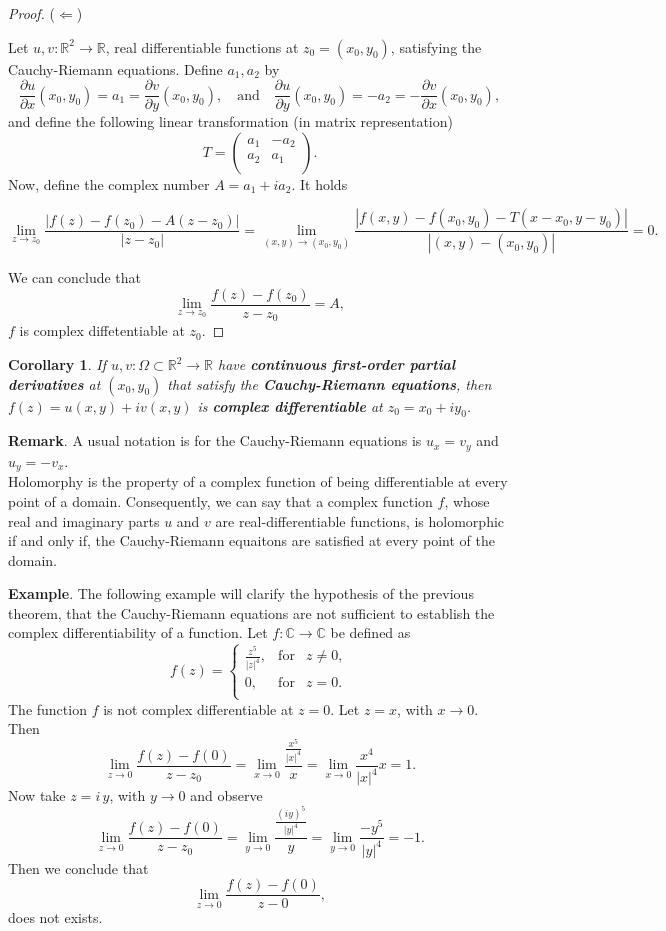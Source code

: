 \documentclass{amsart}
\newtheorem{cor}{Corollary}
\begin{document}
\begin{proof}
(\(\Leftarrow\))

Let \(u,v:\mathbb{R}^2 \to \mathbb{R}\), real differentiable functions at \(z_0 = (x_0, y_0)\), satisfying the Cauchy-Riemann equations. Define \(a_1, a_2\) by
\[  \frac{\partial u}{\partial x}(x_0,y_0) = a_1 = \frac{\partial v}{\partial y}(x_0,y_0), \quad \mbox{and} \quad \frac{\partial u}{\partial y}(x_0,y_0) = - a_2 = - \frac{\partial v}{\partial x}(x_0,y_0),\]
and define the following linear transformation (in matrix representation)
\[ 
T = \left( \begin{array}{cc}
a_1 &  -a_2 \\
a_2 &  a_1 \\
\end{array} \right). \]
Now, define the complex number \(A = a_1 + i a_2\). It holds

\[ \lim_{z\to z_0} \frac{| f(z) - f(z_0) - A (z-z_0) |}{|z- z_0|} = \lim_{(x,y)\to (x_0, y_0)} \frac{| f(x,y) - f(x_0,y_0) - T ( x-x_0, y-y_0) |}{|(x,y) - (x_0, y_0)|} = 0. \]

We can conclude that
\[ \lim_{z\to z_0} \frac{f(z) - f(z_0)}{z- z_0} = A, \]
\(f\) is complex diffetentiable at \(z_0\).
\end{proof}


\begin{cor}
If \(u,v:\Omega\subset \mathbb{R}^2 \to \mathbb{R}\) have \textbf{continuous first-order partial derivatives} at \((x_0,y_0)\) that satisfy the \textbf{Cauchy-Riemann equations}, then \(f(z) = u(x,y) + i v(x, y)\) is \textbf{complex differentiable} at \(z_0 = x_0 + i y_0\).
\end{cor}


\textbf{Remark}. A usual notation is for the Cauchy-Riemann equations is \(u_x = v_y\) and \(u_y = -v_x\).\\
Holomorphy is the property of a complex function of being differentiable at every point of a domain. Consequently, we can say that a complex function \(f\), whose real and imaginary parts \(u\) and \(v\) are real-differentiable functions, is holomorphic if and only if, the Cauchy-Riemann equaitons are satisfied at every point of the domain.

\textbf{Example}. The following example will clarify the hypothesis of the previous theorem, that the Cauchy-Riemann equations are not sufficient to establish the complex differentiability of a function.
Let \(f:\mathbb{C}\to \mathbb{C}\) be defined as
\[ f(z) = \left\{ \begin{array}{ccc}
\frac{z^5}{|z|^4}, & \mbox{for} & z\neq 0, \\
0, & \mbox{for} & z= 0. \\
\end{array} \right. \]
The function \(f\) is not complex differentiable at \(z=0\). Let \(z = x\), with \(x \to 0\). Then
\[ \lim_{z\to 0} \frac{f(z)  - f(0)}{z - z_0} = \lim_{x\to 0}\frac{\frac{x^5}{|x|^4}}{x} = \lim_{x \to 0}\frac{x^4}{|x|^4}{x} = 1 .\]
Now take \(z = i\,y\), with \(y\to 0\) and observe
\[ \lim_{z\to 0} \frac{f(z)  - f(0)}{z - z_0} = \lim_{y\to 0} \frac{\frac{(iy)^5}{|y|^4}}{y} = \lim_{y\to 0}\frac{-y^5}{|y|^4} = -1 .\]
Then we conclude that 
\[ \lim_{z \to 0} \frac{f(z) - f(0)}{z-0} ,\]
does not exists.
\end{document}
